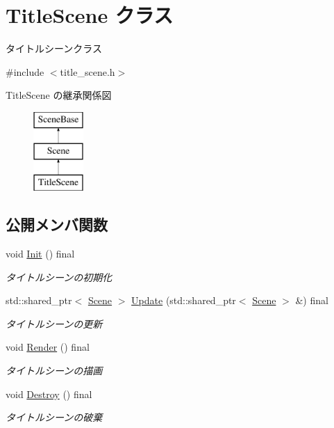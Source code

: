 \hypertarget{class_title_scene}{}\section{Title\+Scene クラス}
\label{class_title_scene}


タイトルシーンクラス  




{\ttfamily \#include $<$title\+\_\+scene.\+h$>$}

Title\+Scene の継承関係図\begin{figure}[H]
\begin{center}
\leavevmode
\includegraphics[height=3.000000cm]{class_title_scene}
\end{center}
\end{figure}
\subsection*{公開メンバ関数}
\begin{DoxyCompactItemize}
\item 
void \mbox{\hyperlink{class_title_scene_a3d039e7db0fa1e22e8c36d3cedfbd318}{Init}} () final
\begin{DoxyCompactList}\small\item\em タイトルシーンの初期化 \end{DoxyCompactList}\item 
std\+::shared\+\_\+ptr$<$ \mbox{\hyperlink{class_scene}{Scene}} $>$ \mbox{\hyperlink{class_title_scene_ab3097e96e2fe65d6fad0d6bb45a14f9f}{Update}} (std\+::shared\+\_\+ptr$<$ \mbox{\hyperlink{class_scene}{Scene}} $>$ \&) final
\begin{DoxyCompactList}\small\item\em タイトルシーンの更新 \end{DoxyCompactList}\item 
void \mbox{\hyperlink{class_title_scene_af12c59b3bf9458640938c5ca620527ae}{Render}} () final
\begin{DoxyCompactList}\small\item\em タイトルシーンの描画 \end{DoxyCompactList}\item 
void \mbox{\hyperlink{class_title_scene_adfbc5f934572ede2e36419b089c88fe8}{Destroy}} () final
\begin{DoxyCompactList}\small\item\em タイトルシーンの破棄 \end{DoxyCompactList}\end{DoxyCompactItemize}


